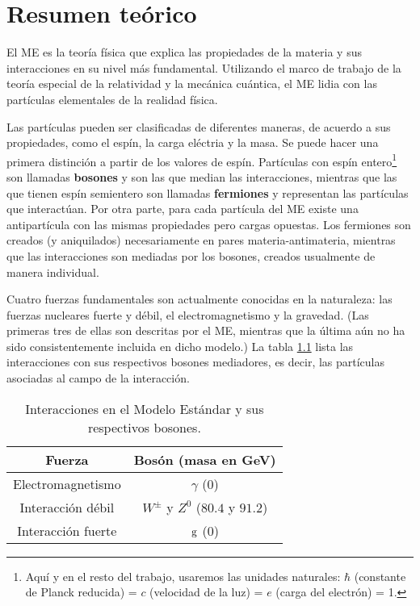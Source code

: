 \chapter{Resumen teórico}
\label{sec:theoretical}

El ME es la teoría física  que explica las propiedades de la materia y sus interacciones en su nivel más fundamental. Utilizando el marco de trabajo de la teoría especial de la relatividad y la mecánica cuántica, el ME lidia con las partículas elementales de la realidad física.

Las partículas pueden ser clasificadas de diferentes maneras, de acuerdo a sus propiedades, como el espín, la carga eléctria y la masa. Se puede hacer una primera distinción a partir de los valores de espín. Partículas con espín entero\footnote{Aquí y en el resto del trabajo, usaremos las unidades naturales: $\hbar$ (constante de Planck reducida) = $c$ (velocidad de la luz) = $e$ (carga del electrón) = 1.} son llamadas \textbf{bosones} y son las que median las interacciones, mientras que las que tienen espín semientero son llamadas \textbf{fermiones} y representan las partículas que interactúan. Por otra parte, para cada partícula del ME existe una antipartícula con las mismas propiedades pero cargas opuestas. Los fermiones son creados (y aniquilados) necesariamente en pares materia-antimateria, mientras que las interacciones son mediadas por los bosones, creados usualmente de manera individual.

Cuatro fuerzas fundamentales son actualmente conocidas en la naturaleza: las fuerzas nucleares fuerte y débil, el electromagnetismo y la gravedad. (Las primeras tres de ellas son descritas por el ME, mientras que la última aún no ha sido consistentemente incluida en dicho modelo.) La tabla \ref{table:SMBoson} lista las interacciones con sus respectivos bosones mediadores, es decir, las partículas asociadas al campo de la interacción.

\begin{table}[!h]
\caption{Interacciones en el Modelo Estándar y sus respectivos bosones.}\smallskip
\label{table:SMBoson}
\centering 

\begin{tabular}{cc}
\hline \hline  
\smallskip
Fuerza& Bosón (masa en GeV\cite{Beringer:1900zz}) \\ 
\hline
Electromagnetismo & $\gamma$ (0) \\
Interacción débil & $W^\pm$ y $Z^0$ ($80.4$ y $91.2$) \\
Interacción fuerte & ${\mathrm g}$ (0) \\
\end{tabular}
\end{table}


